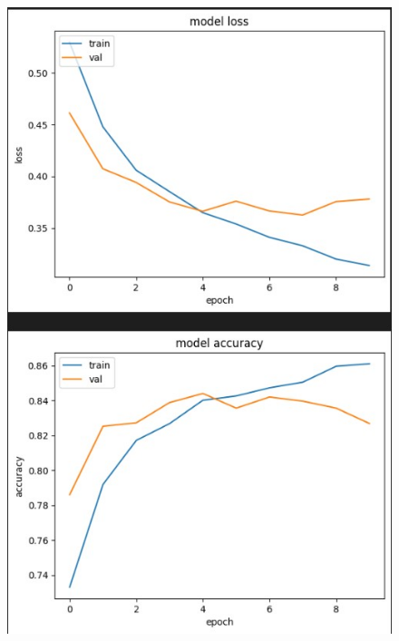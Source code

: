 \documentclass{article}
\begin{document}
\begin{figure}[!h]
    \centering\includegraphics[scale=.65]{./cnn}
    \caption{}\label{fig.52}
\end{figure}
\end{document}

